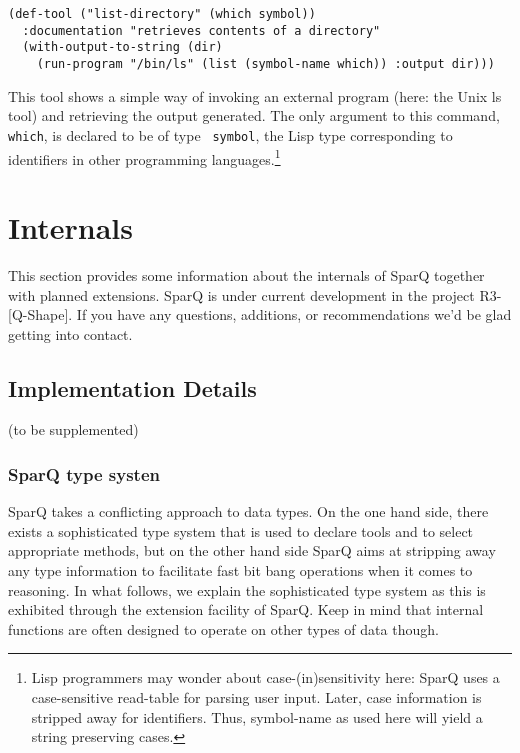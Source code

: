 \documentclass[headsepline]{scrreprt}
\theoremstyle{definition}
\newcommand{\qshape}{R3-[Q-Shape]}
\newcommand{\engine}{SparQ}
\begin{document}
\begin{lstlisting}
(def-tool ("list-directory" (which symbol))
  :documentation "retrieves contents of a directory"
  (with-output-to-string (dir) 
    (run-program "/bin/ls" (list (symbol-name which)) :output dir)))
\end{lstlisting}

This tool shows a simple way of invoking an external program (here: the Unix ls tool) and retrieving the output generated. 
The only argument to this command, \texttt{ which}, is declared to be of type \texttt{ symbol}, the Lisp type corresponding to identifiers in other programming languages.\footnote{Lisp programmers may wonder about case-(in)sensitivity here: \engine{} uses 
a case-sensitive read-table for parsing user input. Later, case information is stripped away for identifiers. Thus, symbol-name as used here will yield a string preserving cases.}




\chapter{Internals}\label{sec:internals}

This section provides some information about the internals of \engine{} together
with planned extensions. \engine{} is under current development in the project
\qshape . If you have any questions, additions, or recommendations we'd be glad
getting into contact.

\section{Implementation Details}

(to be supplemented)

\subsection{\engine{} type systen}
\engine{} takes a conflicting approach to data types. On the one hand side, there exists a sophisticated type system that is used to declare tools and to select appropriate methods, but on the other hand side \engine{} aims at stripping away any type information to facilitate fast bit bang operations when it comes to reasoning. In what follows, we explain the sophisticated type system as this is exhibited through the extension facility of \engine{}. Keep in mind that internal functions are often designed to operate on other types of data though.
\end{document}
